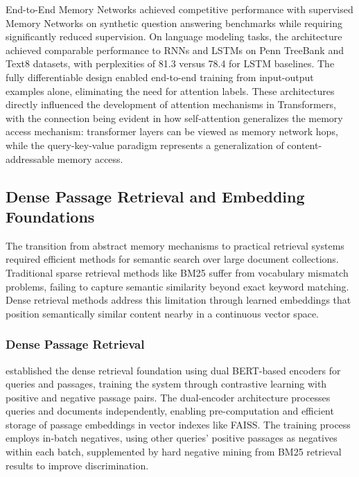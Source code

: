 End-to-End Memory Networks achieved competitive performance with supervised Memory Networks on synthetic question answering benchmarks while requiring significantly reduced supervision. On language modeling tasks, the architecture achieved comparable performance to RNNs and LSTMs on Penn TreeBank and Text8 datasets, with perplexities of 81.3 versus 78.4 for LSTM baselines. The fully differentiable design enabled end-to-end training from input-output examples alone, eliminating the need for attention labels. These architectures directly influenced the development of attention mechanisms in Transformers, with the connection being evident in how self-attention generalizes the memory access mechanism: transformer layers can be viewed as memory network hops, while the query-key-value paradigm represents a generalization of content-addressable memory access.

\subsection{Dense Passage Retrieval and Embedding Foundations}

The transition from abstract memory mechanisms to practical retrieval systems required efficient methods for semantic search over large document collections. Traditional sparse retrieval methods like BM25 suffer from vocabulary mismatch problems, failing to capture semantic similarity beyond exact keyword matching. Dense retrieval methods address this limitation through learned embeddings that position semantically similar content nearby in a continuous vector space.

\subsubsection{Dense Passage Retrieval}

\citet{karpukhin2020dense} established the dense retrieval foundation using dual BERT-based encoders for queries and passages, training the system through contrastive learning with positive and negative passage pairs. The dual-encoder architecture processes queries and documents independently, enabling pre-computation and efficient storage of passage embeddings in vector indexes like FAISS. The training process employs in-batch negatives, using other queries' positive passages as negatives within each batch, supplemented by hard negative mining from BM25 retrieval results to improve discrimination.

